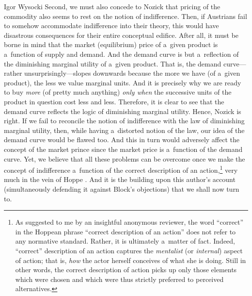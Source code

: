 \begin{artengenv}{Igor Wysocki}
Second, we must also concede to Nozick that pricing of the commodity also seems to rest on the notion of indifference. Then, if Austrians fail to somehow accommodate indifference into their theory, this would have disastrous consequences for their entire conceptual edifice. After all, it must be borne in mind that the market (equilibrium) price of a~given product is a~function of supply and demand. And the demand curve is but a~reflection of the diminishing marginal utility of a~given product. That is, the demand curve---rather unsurprisingly---slopes downwards because the more we have (of a~given product), the less we value marginal units. And it is precisely why we are ready to buy \textit{more} (of pretty much anything) \textit{only when} the successive units of the product in question cost less and less. Therefore, it is clear to see that the demand curve reflects the logic of diminishing marginal utility. Hence, Nozick is right. If we fail to reconcile the notion of indifference with the law of diminishing marginal utility, then, while having a~distorted notion of the law, our idea of the demand curve would be flawed too. And this in turn would adversely affect the concept of the market prince since the market price is a~function of the demand curve. Yet, we believe that all these problems can be overcome once we make the concept of indifference a~function of the correct description of an action,\footnote{As suggested to me by an insightful anonymous reviewer, the word ``correct'' in the Hoppean
\parencite*[][]{hoppe_must_2005} %
 phrase ``correct description of an action'' does not refer to any normative standard. Rather, it is ultimately a~matter of fact. Indeed, ``correct'' description of an action captures the \textit{mentalist} (or \textit{internal}) aspect of action; that is, \textit{how} the actor herself conceives of what she is doing. Still in other words, the correct description of action picks up only those elements which were chosen and which were thus strictly preferred to perceived alternatives.} very much in the vein of Hoppe 
\parencite*[][]{hoppe_must_2005}. %
 And it is the building upon this author's account (simultaneously defending it against Block's objections) that we shall now turn to.


\end{artengenv}
